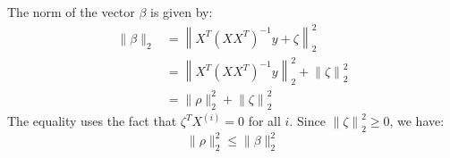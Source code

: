 \begin{answer}
    The norm of the vector $\beta$ is given by:
    \begin{align*}
        \|\beta\|_2 &= \left\|X^T (X X^T)^{-1} y + \zeta\right\|_2^2 \\
        &= \left\|X^T (X X^T)^{-1} y\right\|_2^2 + \left\|\zeta\right\|_2^2 \\
        &= \|\rho\|_2^2 + \left\|\zeta\right\|_2^2
    \end{align*}
    The equality uses the fact that $\zeta^T X^{(i)} = 0$ for all $i$.
    Since $\left\|\zeta\right\|_2^2 \geq 0$, we have:
    $$
    \|\rho\|_2^2 \leq \|\beta\|_2^2
    $$
\end{answer}